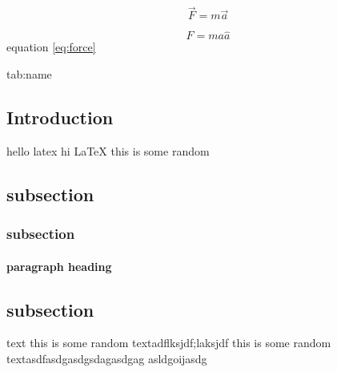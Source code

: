 \begin{equation}
\overrightarrow{F}=m\vec{a}
\label{eq:force}
\end{equation}


\begin{equation}
F=ma\hat{a}
\label{eq:force}
\end{equation}
\blindtext equation \ref{eq:force}


\label{fig:name}
{tab:name}






\begin{multicols}{3}

\section{Introduction}\label{sec:intro}
hello latex
hi \LaTeX
this is some random        
\subsection{subsection}     
\blindtext 
\subsubsection{subsection}    \blindtext  
\paragraph{paragraph heading} \blindtext
\subsection{subsection}        text 
\label{introTwo}
this is some random textadflksjdf;laksjdf
this is some random textasdfasdgasdgsdagasdgag asldgoijasdg
\end{multicols}











